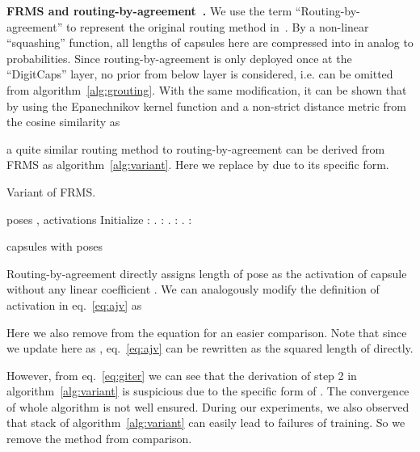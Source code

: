 \documentclass[runningheads]{llncs}
\begin{document}
\textbf{FRMS and routing-by-agreement~\cite{sabour2017dynamic}.} We use the term ``Routing-by-agreement'' to represent the original routing method in~\cite{sabour2017dynamic}. By a non-linear ``squashing'' function, all lengths of capsules here are compressed into  in analog to probabilities. Since routing-by-agreement is only deployed once at the ``DigitCaps'' layer, no prior from below layer is considered, i.e.  can be omitted from algorithm~\ref{alg:grouting}. With the same modification, it can be shown that by using the Epanechnikov kernel function and a non-strict distance metric from the cosine similarity as

a quite similar routing method to routing-by-agreement can be derived from FRMS as algorithm~\ref{alg:variant}. Here we replace  by  due to its specific form. 
\begin{algorithm}
  \caption{Variant of FRMS.}
  \label{alg:variant}
  \begin{algorithmic}
   \REQUIRE poses , activations 
   \STATE Initialize : 
   . : 
   . : 
   . : 

   \ENDFOR
   \RETURN capsules with poses 
  \end{algorithmic}
\end{algorithm}

Routing-by-agreement directly assigns length of pose as the activation of capsule without any linear coefficient . We can analogously modify the definition of activation in eq.~\ref{eq:ajv} as

Here we also remove  from the equation for an easier comparison. Note that since we update  here as , eq.~\ref{eq:ajv} can be rewritten as the squared length of  directly.

However, from eq.~\ref{eq:giter} we can see that the derivation of step 2 in algorithm~\ref{alg:variant} is suspicious due to the specific form of . The convergence of whole algorithm is not well ensured. During our experiments, we also observed that stack of algorithm~\ref{alg:variant} can easily lead to failures of training. So we remove the method from comparison.
\end{document}
